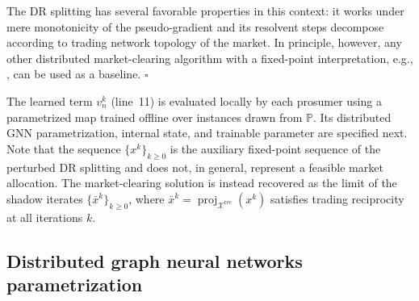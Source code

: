 \documentclass[final]{l4dc2026}
\begin{document}
\begin{remark}
The DR splitting has several favorable properties in this context: it works under mere monotonicity of the pseudo-gradient and its resolvent steps decompose according to trading network topology of the market. In principle, however, any other distributed market-clearing algorithm with a fixed-point interpretation, e.g.,  \citep{sorin2018consensus, baroche2019prosumer, moret2020loss, belgioioso2022operationally, cadre_peer-peer_2020}, can be used as a baseline.
{\hfill $\square$}
\end{remark}

The learned term $v_n^k$ (line~11) is evaluated locally by each prosumer using a parametrized map trained offline over instances drawn from $\mathbb{P}$. Its distributed GNN parametrization, internal state, and trainable parameter are specified next.
Note that the sequence \(\{x^k\}_{k\geq 0}\) is the auxiliary fixed-point sequence of the perturbed DR splitting and does not, in general, represent a feasible market allocation.  The market-clearing solution is instead recovered as the limit of the shadow
iterates \(\{ \bar x^k\}_{k\geq 0} \), where $\bar x^k=\operatorname{proj}_{\mathcal{X}^{\mathrm{rec}}}(x^k)$ satisfies trading reciprocity at all iterations $k$.

\subsection{Distributed graph neural networks parametrization}
\label{sec:gnn}

\end{document}
